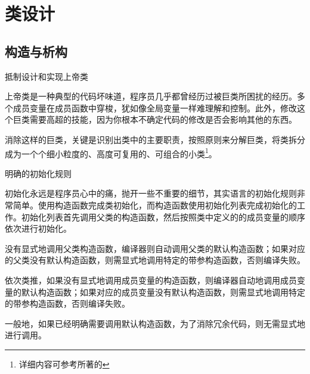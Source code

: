 \begin{savequote}[45mm]
\end{savequote}

\chapter{类设计}
\label{ch:class-design}

\section{构造与析构}

\begin{content}

\begin{regulation}
抵制设计和实现上帝类
\end{regulation}

上帝类是一种典型的代码坏味道，程序员几乎都曾经历过被巨类所困扰的经历。多个成员变量在成员函数中穿梭，犹如像全局变量一样难理解和控制。此外，修改这个巨类需要高超的技能，因为你根本不确定代码的修改是否会影响其他的东西。

消除这样的巨类，关键是识别出类中的主要职责，按照原则来分解巨类，将类拆分成为一个个细小粒度的、高度可复用的、可组合的小类\footnote{详细内容可参考所著的}。

\begin{regulation}
明确\cpp{}的初始化规则
\end{regulation}

初始化永远是程序员心中的痛，抛开一些不重要的细节，其实\cpp{}语言的初始化规则非常简单。\cpp{}使用构造函数完成类初始化，而构造函数使用初始化列表完成初始化的工作。初始化列表首先调用父类的构造函数，然后按照类中定义的的成员变量的顺序依次进行初始化。

没有显式地调用父类构造函数，编译器则自动调用父类的默认构造函数；如果对应的父类没有默认构造函数，则需显式地调用特定的带参构造函数，否则编译失败。

依次类推，如果没有显式地调用成员变量的构造函数，则编译器自动地调用成员变量的默认构造函数；如果对应的成员变量没有默认构造函数，则需显式地调用特定的带参构造函数，否则编译失败。

一般地，如果已经明确需要调用默认构造函数，为了消除冗余代码，则无需显式地进行调用。


\end{content}
